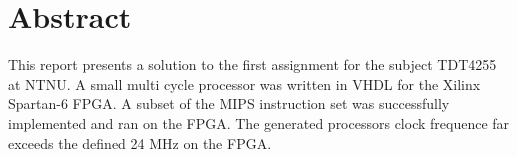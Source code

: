 \section{Abstract}
\label{sec:abstract}

This report presents a solution to the first assignment for the subject TDT4255 at NTNU.
A small multi cycle processor was written in VHDL for the Xilinx Spartan-6 FPGA.
A subset of the MIPS instruction set was successfully implemented and ran on the FPGA.
The generated processors clock frequence far exceeds the defined 24 MHz on the FPGA.
